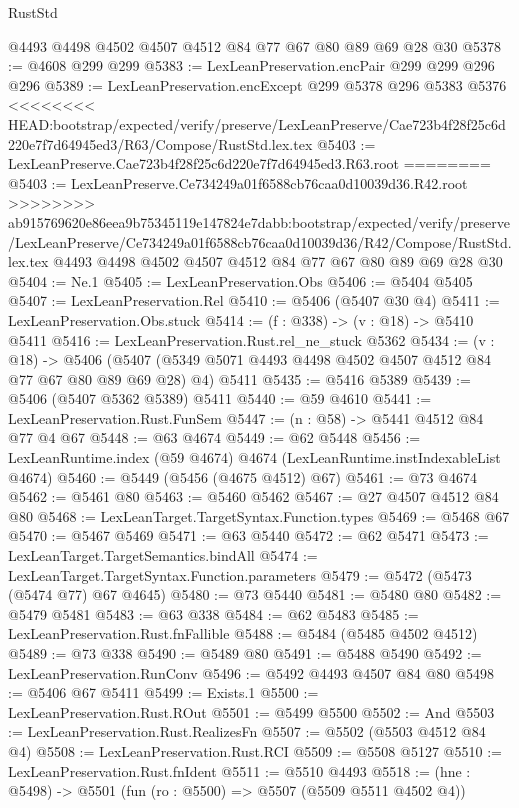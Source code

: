 \begin{lexlean}{RustStd}
\begin{coremodule}
{\begin{coremodule}
{{{{{{{{    @4493
    @4498
    @4502
    @4507
    @4512
    @84
    @77
    @67
    @80
    @89
    @69
    @28
    @30
@5378 := @4608 @299 @299
@5383 := LexLeanPreservation.encPair @299 @299 @296 @296
@5389 := LexLeanPreservation.encExcept @299 @5378 @296 @5383 @5376
<<<<<<<< HEAD:bootstrap/expected/verify/preserve/LexLeanPreserve/Cae723b4f28f25c6d220e7f7d64945ed3/R63/Compose/RustStd.lex.tex
@5403 := LexLeanPreserve.Cae723b4f28f25c6d220e7f7d64945ed3.R63.root
========
@5403 := LexLeanPreserve.Ce734249a01f6588cb76caa0d10039d36.R42.root
>>>>>>>> ab915769620e86eea9b75345119e147824e7dabb:bootstrap/expected/verify/preserve/LexLeanPreserve/Ce734249a01f6588cb76caa0d10039d36/R42/Compose/RustStd.lex.tex
    @4493
    @4498
    @4502
    @4507
    @4512
    @84
    @77
    @67
    @80
    @89
    @69
    @28
    @30
@5404 := Ne.{1}
@5405 := LexLeanPreservation.Obs
@5406 := @5404 @5405
@5407 := LexLeanPreservation.Rel
@5410 := @5406 (@5407 @30 @4)
@5411 := LexLeanPreservation.Obs.stuck
@5414 := (f : @338) -> (v : @18) -> @5410 @5411
@5416 := LexLeanPreservation.Rust.rel_ne_stuck @5362
@5434 := (v : @18) ->
  @5406 (@5407 (@5349 @5071 @4493 @4498 @4502 @4507 @4512 @84 @77 @67 @80 @89 @69 @28) @4) @5411
@5435 := @5416 @5389
@5439 := @5406 (@5407 @5362 @5389) @5411
@5440 := @59 @4610
@5441 := LexLeanPreservation.Rust.FunSem
@5447 := (n : @58) -> @5441 @4512 @84 @77 @4 @67
@5448 := @63 @4674
@5449 := @62 @5448
@5456 := LexLeanRuntime.index (@59 @4674) @4674 (LexLeanRuntime.instIndexableList @4674)
@5460 := @5449 (@5456 (@4675 @4512) @67)
@5461 := @73 @4674
@5462 := @5461 @80
@5463 := @5460 @5462
@5467 := @27 @4507 @4512 @84 @80
@5468 := LexLeanTarget.TargetSyntax.Function.types
@5469 := @5468 @67
@5470 := @5467 @5469
@5471 := @63 @5440
@5472 := @62 @5471
@5473 := LexLeanTarget.TargetSemantics.bindAll
@5474 := LexLeanTarget.TargetSyntax.Function.parameters
@5479 := @5472 (@5473 (@5474 @77) @67 @4645)
@5480 := @73 @5440
@5481 := @5480 @80
@5482 := @5479 @5481
@5483 := @63 @338
@5484 := @62 @5483
@5485 := LexLeanPreservation.Rust.fnFallible
@5488 := @5484 (@5485 @4502 @4512)
@5489 := @73 @338
@5490 := @5489 @80
@5491 := @5488 @5490
@5492 := LexLeanPreservation.RunConv
@5496 := @5492 @4493 @4507 @84 @80
@5498 := @5406 @67 @5411
@5499 := Exists.{1}
@5500 := LexLeanPreservation.Rust.ROut
@5501 := @5499 @5500
@5502 := And
@5503 := LexLeanPreservation.Rust.RealizesFn
@5507 := @5502 (@5503 @4512 @84 @4)
@5508 := LexLeanPreservation.Rust.RCI
@5509 := @5508 @5127
@5510 := LexLeanPreservation.Rust.fnIdent
@5511 := @5510 @4493
@5518 := (hne : @5498) -> @5501 (fun (ro : @5500) => @5507 (@5509 @5511 @4502 @4))
}}}}}}}}
\end{coremodule}}
\end{coremodule}
\end{lexlean}
